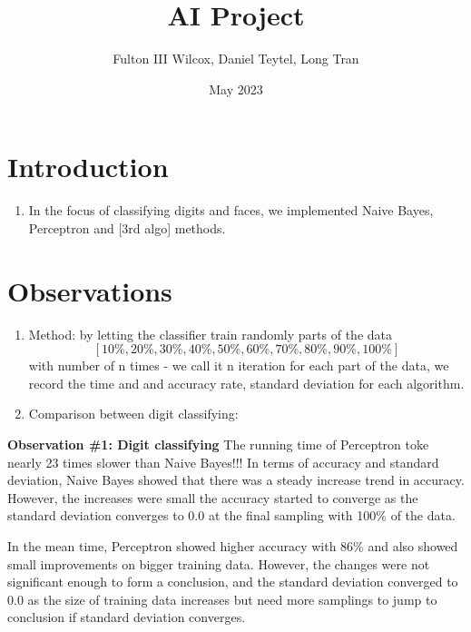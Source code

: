 \documentclass{article}
\title{AI Project}
\author{Fulton III Wilcox, Daniel Teytel, Long Tran}
\date{May 2023}
\begin{document}
\maketitle

\section{Introduction}
\begin{enumerate}
    \item[] In the focus of classifying digits and faces, we implemented Naive Bayes, Perceptron and [3rd algo] methods.
\end{enumerate}

\section{Observations}
\begin{enumerate}
    \item[] Method: by letting the classifier train randomly parts of the data \[[10\%, 20\%, 30\%, 40\%, 50\%, 60\%, 70\%, 80\%, 90\%, 100\%]\]with number of n times - we call it n iteration for each part of the data, we record the time and and accuracy rate, standard deviation for each algorithm.

    \item[] Comparison between digit classifying:
\end{enumerate}









\textbf{Observation \#1: Digit classifying}
The running time of Perceptron toke nearly 23 times slower than Naive Bayes!!! In terms of accuracy and standard deviation, Naive Bayes showed that there was a steady increase trend in accuracy. However, the increases were small the accuracy started to converge as the standard deviation converges to 0.0 at the final sampling with 100\% of the data.

In the mean time, Perceptron showed higher accuracy with 86\% and also showed small improvements on bigger training data. However, the changes were not significant enough to form a conclusion, and the standard deviation converged to 0.0 as the size of training data increases but need more samplings to jump to conclusion if standard deviation converges.
\end{document}

